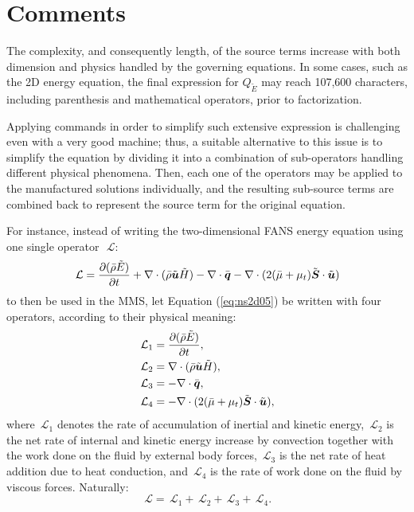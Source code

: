 \documentclass[10pt]{article}
\newcommand{\Diff}[2] {\dfrac{\partial( #1)}{\partial #2}}
\newcommand{\bv}[1]{\ensuremath{\mbox{\boldmath$ #1 $}}}
\newcommand{\Lo}{\,\mathcal{L}}
\newcommand{\tE}{\tilde{E}}
\newcommand{\bmu}{\bar{\mu}}
\begin{document}
\section{Comments}
The complexity, and consequently length, of the source terms increase with both dimension and physics handled by the governing equations. In some cases, such as the 2D energy equation, the final expression for $Q_{\tE}$ may reach 107,600 characters, including parenthesis and mathematical operators, prior to factorization.

Applying commands in order to simplify such extensive expression is challenging even with a very good machine; thus, a suitable alternative to this issue is to simplify the equation by dividing it into a combination of sub-operators handling different physical phenomena. Then, each one of the operators may be applied to the manufactured solutions individually, and the resulting sub-source terms are combined back to represent the source term for the original equation.



For instance, instead of writing the two-dimensional FANS energy equation using one single operator~$\Lo$:
 \begin{equation} \label{eq:ns2d05}
\Lo= \Diff{\bar{\rho} \tilde{E}}{t}+ \nabla \cdot (\bar{\rho} \tilde{\bv{u}} \tilde{H})-\nabla \cdot \bar{\bv{q}} - \nabla\cdot(2 (\bmu+\mu_t) \tilde{\bv{S}} \cdot \tilde{\bv{u}})
\end{equation}
to then be used in the MMS, let Equation (\ref{eq:ns2d05}) be written with four operators, according to their physical meaning:
\begin{equation}
 \begin{split}\label{sub01}
  \Lo_1&=\Diff{\bar{\rho} \tilde{E}}{t},\\
  \Lo_2&=\nabla \cdot (\bar{\rho} \tilde{\bv{u}} \tilde{H}),\\
  \Lo_3&=-\nabla \cdot \bar{\bv{q}},\\
  \Lo_4&=-\nabla\cdot(2 (\bmu+\mu_t) \tilde{\bv{S}} \cdot \tilde{\bv{u}}),
 \end{split}
\end{equation}
where $\Lo_1$ denotes the rate of accumulation of inertial and kinetic energy, $\Lo_2$ is the net rate of internal and kinetic energy increase by convection together with the work done on the fluid by external body forces, $\Lo_3$ is the net rate of heat addition due to heat conduction, and $\Lo_4$ is the rate of work done on the fluid by viscous forces. Naturally:
$$\Lo=\Lo_1+\Lo_2+\Lo_3+\Lo_4.$$
\end{document}
